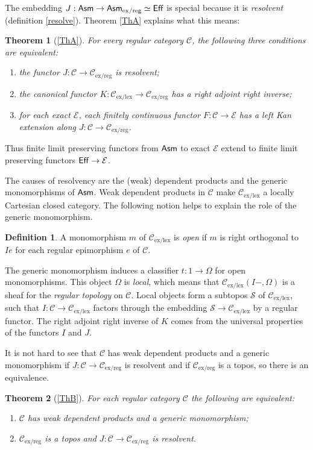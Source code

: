 \documentclass[sort&compress]{elsarticle}
\theoremstyle{plain}
\newtheorem*{theorem*}{Theorem}
\theoremstyle{definition}
\newtheorem{defin}[theorem]{Definition}
\theoremstyle{remark}
\newcommand\cat\mathcal
\newcommand\exlex{_\mathrm{ex/lex}}\newcommand\exreg{_\mathrm{ex/reg}}
\begin{document}
The embedding $J:\Asm \to \Asm\exreg\simeq \Eff$ is special because it is \emph{resolvent} (definition \ref{resolve}). Theorem \ref{ThA} explains what this means:

\begin{theorem*}[\ref{ThA}]
For every regular category $\cat C$, the following three conditions are equivalent:
\begin{enumerate}[1.]%
\item the functor $J:\cat C \to\cat C\exreg$ is resolvent;
\item the canonical functor $K:\cat C\exlex\to\cat C\exreg$ has a right adjoint right inverse;
\item for each exact $\cat E$, each finitely continuous functor $F:\cat C \to \cat E$ has a left Kan extension along $J:\cat C \to \cat C\exreg$.
\end{enumerate}
\end{theorem*}

Thus finite limit preserving functors from $\mathsf{Asm}$ to exact $\cat E$ extend to finite limit preserving functors $\Eff\to \cat E$.

The causes of resolvency are the (weak) dependent products and the generic monomorphisms of $\mathsf{Asm}$. Weak dependent products in $\cat C$ make $\cat C\exlex$ a locally Cartesian closed category. The following notion helps to explain the role of the generic monomorphism.

\begin{defin} A monomorphism $m$ of $\cat C\exlex$ is \emph{open} if $m$ is right orthogonal to $Ie$ for each regular epimorphism $e$ of $\cat C$.
\end{defin}

The generic monomorphism induces a classifier $t:1\to \Omega$ for open monomorphisms. This object $\Omega$ is \emph{local}, which means that $\cat C\exlex(I-,\Omega)$ is a sheaf for the \emph{regular topology} on $\cat C$. Local objects form a subtopos $\cat S$ of $\cat C\exlex$, %
such that $I:\cat C \to \cat C\exlex$ factors through the embedding $\cat S \to \cat C\exlex$ by a regular functor. The right adjoint right inverse of $K$ comes from the universal properties of the functors $I$ and $J$.

It is not hard to see that $\cat C$ has weak dependent products and a generic monomorphism if $J:\cat C \to \cat C\exreg$ is resolvent and if $\cat C\exreg$ is a topos, so there is an equivalence.

\begin{theorem*}[\ref{ThB}] For each regular category $\cat C$ the following are equivalent:
\begin{enumerate}
\item $\cat C$ has weak dependent products and a generic monomorphism;
\item $\cat C\exreg$ is a topos and $J:\cat C\to\cat C\exreg$ is resolvent.
\end{enumerate}
\end{theorem*}
\end{document}
